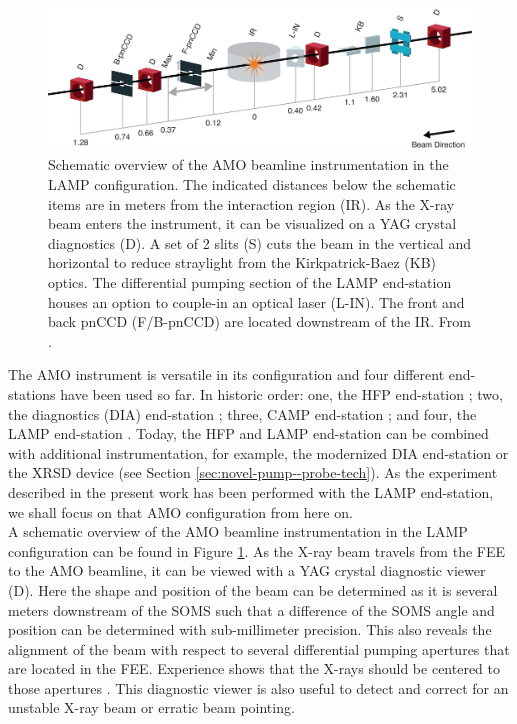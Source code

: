 \begin{figure}
	\centering
		\includegraphics[width=1.00\textwidth]{images/beam_layout.png}
	\caption[Schematic overview of the AMO beamline instrumentation.]{Schematic overview of the AMO beamline instrumentation in the LAMP configuration. The indicated distances below the schematic items are in meters from the interaction region (IR). As the X-ray beam enters the instrument, it can be visualized on a YAG crystal diagnostics (D). A set of 2 slits (S) cuts the beam in the vertical and horizontal to reduce straylight from the Kirkpatrick-Baez (KB) optics. The differential pumping section of the LAMP end-station houses an option to couple-in an optical laser (L-IN). The front and back pnCCD (F/B-pnCCD) are located downstream of the IR. From \citep{Ferguson-2015-JSR}.}
	\label{fig:beam_layout}
\end{figure}
%
The AMO instrument is versatile in its configuration and four different end-stations have been used so far. In historic order: one, the HFP end-station \citep{Bozek-2009-EPJST,Bostedt-2013-JPB}; two, the diagnostics (DIA) end-station \citep{Bostedt-2013-JPB}; three, CAMP end-station \citep{Strueder-2010-NIMPA}; and four, the LAMP end-station \citep{Ferguson-2015-JSR,Bucher-2016-Unpublished}. Today, the HFP and LAMP end-station can be combined with additional instrumentation, for example, the modernized DIA end-station or the XRSD device (see Section \ref{sec:novel-pump--probe-tech}). As the experiment described in the present work has been performed with the LAMP end-station, we shall focus on that AMO configuration from here on.\\[1\baselineskip]
%
A schematic overview of the AMO beamline instrumentation in the LAMP configuration can be found in Figure \ref{fig:beam_layout}. As the X-ray beam travels from the FEE to the AMO beamline, it can be viewed with a YAG crystal diagnostic viewer (D). Here the shape and position of the beam can be determined as it is several meters downstream of the SOMS such that a difference of the SOMS angle and position can be determined with sub-millimeter precision. This also reveals the alignment of the beam with respect to several differential pumping apertures that are located in the FEE. Experience shows that the X-rays should be centered to those apertures \citep{Turner-2016-PC}. This diagnostic viewer is also useful to detect and correct for an unstable X-ray beam or erratic beam pointing.
